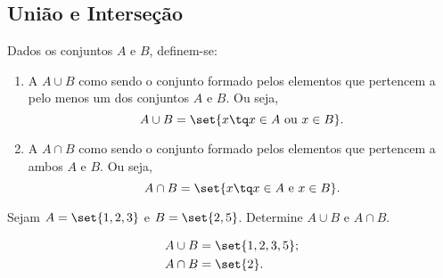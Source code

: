 \subsection{União e Interseção}

\begin{definition}
Dados os conjuntos $A$ e $B$, definem-se:
\begin{enumerate}
    \item
        A  $A \cup B$ como sendo o conjunto formado pelos elementos que pertencem a pelo menos um dos conjuntos $A$ e $B$. Ou seja,
    $$ A \cup B = \set{x \tq x \in A \text{ ou } x \in B} . $$
    
    \item
        A  $A \cap B$ como sendo o conjunto formado pelos elementos que pertencem a ambos $A$ e $B$. Ou seja,
        $$ A \cap B = \set{x \tq x \in A \text{ e } x \in B}. $$
\end{enumerate}
\end{definition}

\begin{example}
Sejam $A = \set{1, 2, 3}$ e $ B = \set{2,5}$. Determine $A \cup B$ e $A \cap B$.
\end{example}

\begin{solution}
\begin{align*}
    A \cup B &= \set{1,2,3,5};\\
    A \cap B &= \set{2}.
\end{align*}
\end{solution}

